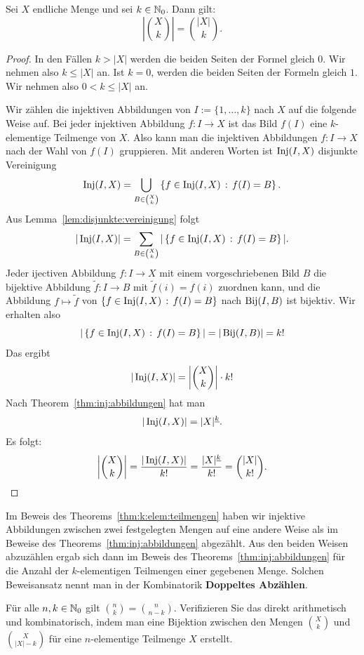 \begin{thm} \label{thm:k:elem:teilmengen} 
		Sei $X$ endliche Menge und sei $k \in \mathbb{N}_0$. Dann gilt: 
		\[
				\left| \binom{X}{k} \right| = \binom{|X|}{k}. 
		\]
\end{thm} 
\begin{proof} 
	In den Fällen $k > |X|$ werden die beiden Seiten der Formel gleich $0$. Wir nehmen also $k \le |X|$ an. Ist $k=0$, werden die beiden Seiten der Formeln gleich $1$. Wir nehmen also $0 < k \le |X|$ an. 
	
	Wir zählen die injektiven Abbildungen von $I:=\{1,\ldots,k\}$ nach $X$ auf die folgende  Weise auf. Bei jeder injektiven Abbildung $f : I \to X$ ist das Bild $f(I)$ eine $k$-elementige Teilmenge von $X$. Also kann man die injektiven Abbildungen $f: I \to X$  nach der Wahl von $f(I)$ gruppieren. Mit anderen Worten ist $\operatorname{Inj}(I,X)$ disjunkte Vereinigung
	\[
		\operatorname{Inj}(I,X)  = \bigcup_{B \in \binom{X}{k} } \left\{ f \in \operatorname{Inj}(I,X) \,:\, f(I) = B \right\}. 
	\]
	Aus Lemma~\ref{lem:disjunkte:vereinigung} folgt
	\[
		|\operatorname{Inj}(I,X) | = \sum_{B \in \binom{X}{k} } | \left\{ f \in \operatorname{Inj}(I,X) \,:\, f(I) = B \right\}|. 
	\]
	Jeder ijectiven Abbildung $ f: I \to X$ mit einem vorgeschriebenen Bild $B$ 
	die bijektive Abbildung $\tilde{f} : I \to B$ mit $\tilde{f}(i) = f(i)$ zuordnen kann, und die Abbildung $f \mapsto \tilde{f}$ von $\left\{ f \in \operatorname{Inj}(I,X) \,:\, f(I) = B \right\}$ nach $\operatorname{Bij}(I,B)$ ist bijektiv. 
	Wir erhalten also 
	\[
			| \left\{ f \in \operatorname{Inj}(I,X) \,:\, f(I) = B \right\}| = |\operatorname{Bij}(I,B)| = k!
	\]
	Das ergibt
	\[
		|\operatorname{Inj}(I,X) | = \left| \binom{X}{k} \right| \cdot k!
	\]
	Nach Theorem~\ref{thm:inj:abbildungen} hat man 
	\[
		|\operatorname{Inj}(I,X)| = |X|^{\underline{k}}. 
	\]
	Es folgt: 
	\[
		\left| \binom{X}{k} \right| = \frac{|\operatorname{Inj}(I,X) |}{k!} = \frac{|X|^{\underline{k}}}{k!} = \binom{|X|}{k!}. 
	\]
\end{proof} 

\begin{bem} 
	Im Beweis des  Theorems~\ref{thm:k:elem:teilmengen} haben wir injektive Abbildungen zwischen zwei festgelegten Mengen auf eine andere Weise als im Beweise des Theorems~\ref{thm:inj:abbildungen} abgezählt. Aus den beiden Weisen abzuzählen ergab sich dann im Beweis des Theorems~\ref{thm:inj:abbildungen} für die Anzahl der $k$-elementigen Teilmengen einer gegebenen Menge. Solchen Beweisansatz nennt man in der Kombinatorik \textbf{Doppeltes Abzählen}. 
\end{bem} 

\begin{aufg}
	Für alle $n,k \in \mathbb{N}_0$ gilt $\binom{n}{k} = \binom{n}{n-k}$. Verifizieren Sie das direkt arithmetisch und kombinatorisch, indem man eine Bijektion zwischen 
	den Mengen $\binom{X}{k}$ und $\binom{X}{|X|-k}$ für eine $n$-elementige Teilmenge $X$ erstellt. 
\end{aufg} 

